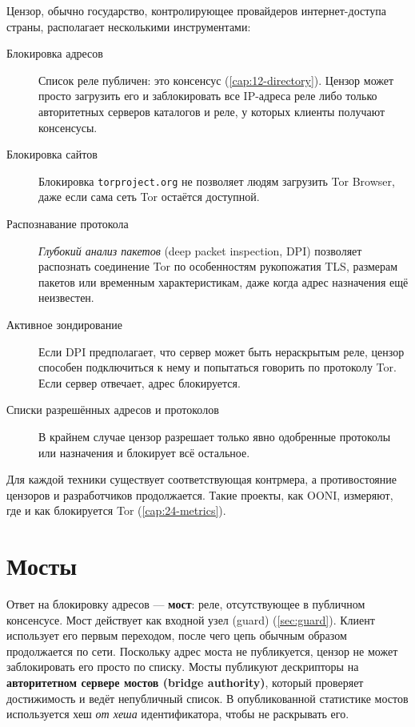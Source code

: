 Цензор, обычно государство, контролирующее провайдеров интернет-доступа страны, располагает несколькими инструментами:
\begin{description}
  \item[Блокировка адресов] Список реле публичен: это консенсус (\cref{cap:12-directory}). Цензор может просто загрузить его и заблокировать все IP-адреса реле либо только авторитетных серверов каталогов и реле, у которых клиенты получают консенсусы.
  \item[Блокировка сайтов] Блокировка \texttt{torproject.org} не позволяет людям загрузить Tor Browser, даже если сама сеть Tor остаётся доступной.
  \item[Распознавание протокола] \emph{Глубокий анализ пакетов} (deep packet inspection, DPI) позволяет распознать соединение Tor по особенностям рукопожатия TLS, размерам пакетов или временным характеристикам, даже когда адрес назначения ещё неизвестен.
  \item[Активное зондирование] Если DPI предполагает, что сервер может быть нераскрытым реле, цензор способен подключиться к нему и попытаться говорить по протоколу Tor. Если сервер отвечает, адрес блокируется.
  \item[Списки разрешённых адресов и протоколов] В крайнем случае цензор разрешает только явно одобренные протоколы или назначения и блокирует всё остальное.
\end{description}
Для каждой техники существует соответствующая контрмера, а противостояние цензоров и разработчиков продолжается. Такие проекты, как OONI, измеряют, где и как блокируется Tor (\cref{cap:24-metrics}).

\section{Мосты}\label{sec:cens-bridge}

Ответ на блокировку адресов --- \textbf{мост}: реле, отсутствующее в публичном консенсусе. Мост действует как входной узел (guard) (\cref{sec:guard}). Клиент использует его первым переходом, после чего цепь обычным образом продолжается по сети. Поскольку адрес моста не публикуется, цензор не может заблокировать его просто по списку. Мосты публикуют дескрипторы на \textbf{авторитетном сервере мостов (bridge authority)}, который проверяет достижимость и ведёт непубличный список. В опубликованной статистике мостов используется хеш \emph{от хеша} идентификатора, чтобы не раскрывать его.

